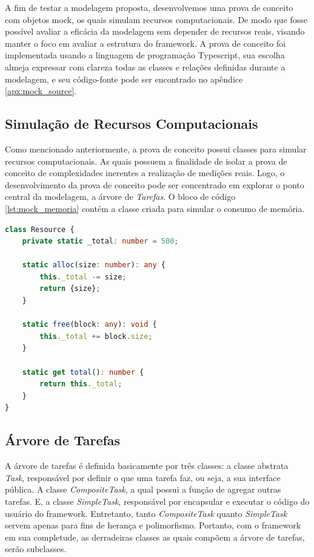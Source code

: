 \documentclass[12pt]{tcc}
\begin{document}
A fim de testar a modelagem proposta, desenvolvemos uma prova de conceito com objetos mock, os quais simulam recursos computacionais.
De modo que fosse possível avaliar a eficácia da modelagem sem depender de recursos reais, visando manter o foco em avaliar a estrutura do framework.
A prova de conceito foi implementada usando a linguagem de programação Typescript, sua escolha almeja expressar com clareza todas as classes e relações definidas durante a modelagem, e seu código-fonte pode ser encontrado no apêndice \ref{apx:mock_source}.


\subsection{Simulação de Recursos Computacionais}
Como mencionado anteriormente, a prova de conceito possui classes para simular recursos computacionais.
As quais possuem a finalidade de isolar a prova de conceito de complexidades inerentes a realização de medições reais.
Logo, o desenvolvimento da prova de conceito pode ser concentrado em explorar o ponto central da modelagem, a árvore de \emph{Tarefas}.
O bloco de código \ref{lst:mock_memoria} contém a classe criada para simular o consumo de memória.

\begin{lstlisting}[label={lst:mock_memoria}, caption={Implementação da classe responsável por simular recursos de memória para a prova de conceito do framework.}, language=TypeScript]
class Resource {
	private static _total: number = 500;

	static alloc(size: number): any {
		this._total -= size;
		return {size};
	}

	static free(block: any): void {
		this._total += block.size;
	}

	static get total(): number {
		return this._total;
	}
}
\end{lstlisting}


\subsection{Árvore de Tarefas}

A árvore de tarefas é definida basicamente por três classes:
a classe abstrata \emph{Task}, responsável por definir o que uma tarefa faz, ou seja, a sua interface pública.
A classe \emph{CompositeTask}, a qual possui a função de agregar outras tarefas.
E, a classe \emph{SimpleTask}, responsável por encapsular e executar o código do usuário do framework.
Entretanto, tanto \emph{CompositeTask} quanto \emph{SimpleTask} servem apenas para fins de herança e polimorfismo.
Portanto, com o framework em sua completude, as derradeiras classes as quais compõem a árvore de tarefas, serão subclasses.
\end{document}

